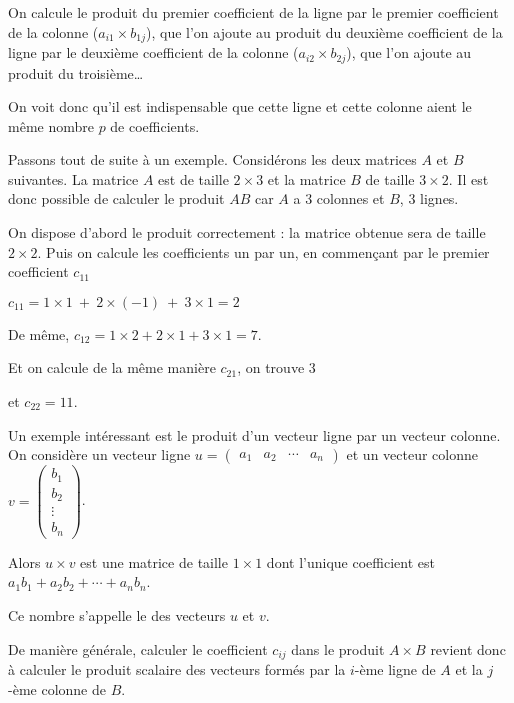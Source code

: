 On calcule le produit du premier coefficient de la ligne par le premier coefficient 
de la colonne ($a_{i1} \times b_{1j}$), que l'on ajoute au produit du deuxième coefficient de la ligne par le deuxième coefficient 
de la colonne ($a_{i2} \times b_{2j}$), que l'on ajoute au produit du troisième\ldots

On voit donc qu'il est indispensable que cette ligne et cette colonne aient le même nombre $p$ de coefficients.


\diapo

Passons tout de suite à un exemple. Considérons les deux matrices $A$ et $B$ suivantes. 
La matrice $A$ est de taille $2\times 3$ et la matrice $B$ de taille $3\times 2$. 
Il est donc possible de calculer le produit $AB$ car $A$ a $3$ colonnes et $B$, $3$ lignes.

\change
On dispose d'abord le produit correctement : la matrice obtenue sera de taille $2\times2$. Puis on calcule les coefficients un par un,
en commençant par le premier coefficient $c_{11} $

\change
 $c_{11}= 1\times 1\ +\ 2\times(-1)\ +\ 3\times1=2$

\change
De même, $c_{12}=1\times2+2\times1+3\times1=7$.

\change
Et on calcule de la même manière $c_{21}$, on trouve $3$

\change
et $c_{22}=11$.



\diapo
Un exemple intéressant est le produit d'un vecteur ligne par un vecteur colonne. On considère un vecteur ligne $u = \begin{pmatrix} a_1 & a_2 & \cdots & a_n \end{pmatrix} $ et un vecteur colonne $v = \begin{pmatrix} b_1 \\ b_2 \\ \vdots \\ b_n \end{pmatrix}$.

\change
Alors $u \times v$ est une matrice de taille $1\times 1$ dont l'unique coefficient est
$a_1 b_1 + a_2 b_2 + \cdots + a_n b_n$.

\change
Ce nombre s'appelle le  des vecteurs $u$ et $v$.


De manière générale, calculer le coefficient $c_{ij}$ dans le produit $A\times B$
revient donc à calculer le produit scalaire des vecteurs formés 
par la $i$-ème ligne de $A$ et la $j$-ème colonne de $B$.


